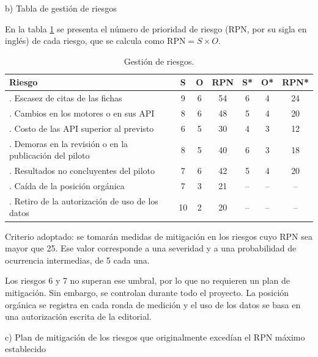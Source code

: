 \documentclass[
11pt, %
codirector, %
]{charter}
\begin{document}
b) Tabla de gestión de riesgos

En la tabla \ref{tab:riesgos} se presenta el número de prioridad de riesgo (RPN, por su sigla en inglés) de cada riesgo, que se calcula como $\mathrm{RPN} = S \times O$.

\begin{table}[htpb]
\centering
\caption{Gestión de riesgos.}
\label{tab:riesgos}
\begin{tabularx}{\linewidth}{@{}|>{\raggedright\arraybackslash}X|c|c|c|c|c|c|@{}}
\hline
\rowcolor[HTML]{C0C0C0}
Riesgo & S & O & RPN & S* & O* & RPN* \\ \hline
1. Escasez de citas de las fichas & 9 & 6 & 54 & 6 & 4 & 24 \\ \hline
2. Cambios en los motores o en sus API & 8 & 6 & 48 & 5 & 4 & 20 \\ \hline
3. Costo de las API superior al previsto & 6 & 5 & 30 & 4 & 3 & 12 \\ \hline
4. Demoras en la revisión o en la publicación del piloto & 8 & 5 & 40 & 6 & 3 & 18 \\ \hline
5. Resultados no concluyentes del piloto & 7 & 6 & 42 & 5 & 4 & 20 \\ \hline
6. Caída de la posición orgánica & 7 & 3 & 21 & -- & -- & -- \\ \hline
7. Retiro de la autorización de uso de los datos & 10 & 2 & 20 & -- & -- & -- \\ \hline
\end{tabularx}
\end{table}

Criterio adoptado: se tomarán medidas de mitigación en los riesgos cuyo RPN sea mayor que 25. Ese valor corresponde a una severidad y a una probabilidad de ocurrencia intermedias, de 5 cada una.

Los riesgos 6 y 7 no superan ese umbral, por lo que no requieren un plan de mitigación. Sin embargo, se controlan durante todo el proyecto. La posición orgánica se registra en cada ronda de medición y el uso de los datos se basa en una autorización escrita de la editorial.


c) Plan de mitigación de los riesgos que originalmente excedían el RPN máximo establecido
\end{document}
